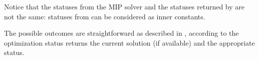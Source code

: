 Notice that the statuses from the MIP solver and the statuses returned by  are not the same: statuses from  can be 
considered as inner constants. 

The possible outcomes are straightforward as described in , according to the optimization status  returns the current
solution (if available) and the appropriate status. 